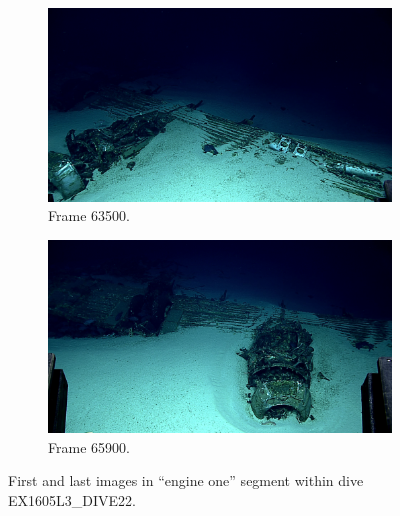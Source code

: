 \documentclass[letterpaper,12pt]{article}
\begin{document}
\begin{figure}[p]
    \centering
    \begin{subfigure}[b]{0.48\textwidth}
        \includegraphics[width=\textwidth]{images/image_063500.png}
        \caption{Frame 63500.}
        \label{fig:ex1605l3_dive22_engine_one_begin}
    \end{subfigure}
    \begin{subfigure}[b]{0.48\textwidth}
        \includegraphics[width=\textwidth]{images/image_065900.png}
        \caption{Frame 65900.}
        \label{fig:ex1605l3_dive22_engine_one_end}
    \end{subfigure}
    \caption{First and last images in ``engine one'' segment within dive EX1605L3\_DIVE22.}
\end{figure}
\end{document}
